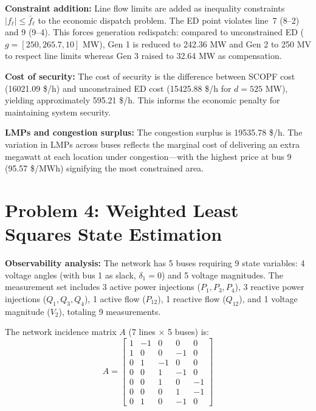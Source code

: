\documentclass{article}
\begin{document}
\textbf{Constraint addition:} Line flow limits are added as inequality constraints $|f_\ell| \leq \bar{f}_\ell$ to the economic dispatch problem. The ED point violates line~7 (8--2) and 9 (9--4). This forces generation redispatch: compared to unconstrained ED ($g=[250, 265.7, 10]$ MW), Gen 1 is reduced to 242.36 MW and Gen 2 to 250 MV to respect line limits whereas Gen 3 raised to 32.64 MW as compensation.

\textbf{Cost of security:} The cost of security is the difference between SCOPF cost (16021.09 \$/h) and unconstrained ED cost (15425.88 \$/h for $d=525$ MW), yielding approximately 595.21 \$/h. This informs the economic penalty for maintaining system security.


\textbf{LMPs and congestion surplus:} The congestion surplus is 19535.78 \$/h. The variation in LMPs across buses reflects the marginal cost of delivering an extra megawatt at each location under congestion—with the highest price at bus 9 (95.57 \$/MWh) signifying the most constrained area. 




\newpage
\section*{Problem 4: Weighted Least Squares State Estimation}


\textbf{Observability analysis:} The network has 5 buses requiring 9 state variables: 4 voltage angles (with bus 1 as slack, $\delta_1 = 0$) and 5 voltage magnitudes. The measurement set includes 3 active power injections ($P_1, P_3, P_4$), 3 reactive power injections ($Q_1, Q_3, Q_4$), 1 active flow ($P_{12}$), 1 reactive flow ($Q_{12}$), and 1 voltage magnitude ($V_2$), totaling 9 measurements.

The network incidence matrix $A$ (7 lines × 5 buses) is:
\[
A = \begin{bmatrix}
1 & -1 & 0 & 0 & 0 \\
1 & 0 & 0 & -1 & 0 \\
0 & 1 & -1 & 0 & 0 \\
0 & 0 & 1 & -1 & 0 \\
0 & 0 & 1 & 0 & -1 \\
0 & 0 & 0 & 1 & -1 \\
0 & 1 & 0 & -1 & 0
\end{bmatrix}
\]
\end{document}
